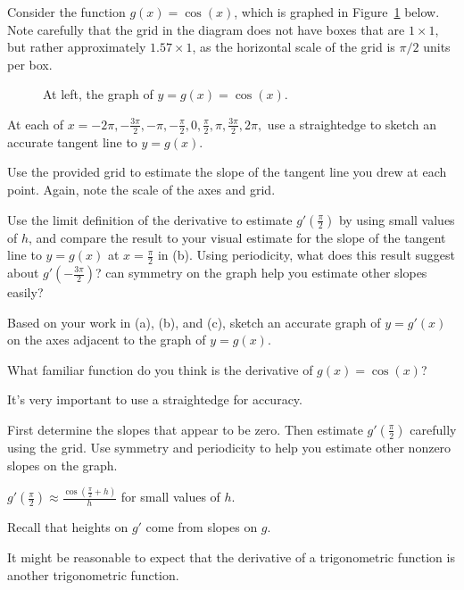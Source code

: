 \begin{activity} \label{A:2.2.2}  Consider the function $g(x) = \cos(x)$, which is graphed in Figure~\ref{F:2.2.A2} below.  Note carefully that the grid in the diagram does not have boxes that are $1 \times 1$, but rather approximately $1.57 \times 1$, as the horizontal scale of the grid is $\pi/2$ units per box.
\begin{figure}[h]
\begin{center}
\caption{At left, the graph of $y = g(x) = \cos(x)$.} \label{F:2.2.A2}
\end{center}
\end{figure}

\ba
	\item At each of $x = -2\pi, -\frac{3\pi}{2}, -\pi, -\frac{\pi}{2}, 0, \frac{\pi}{2}, \pi, \frac{3\pi}{2}, 2\pi,$ use a straightedge to sketch an accurate tangent line to $y = g(x)$.
	\item Use the provided grid to estimate the slope of the tangent line you drew at each point.  Again, note the scale of the axes and grid.
	\item Use the limit definition of the derivative to estimate $g'(\frac{\pi}{2})$ by using small values of $h$, and compare the result to your visual estimate for the slope of the tangent line to $y = g(x)$ at $x = \frac{\pi}{2}$ in (b).  Using periodicity, what does this result suggest about $g'(-\frac{3\pi}{2})$?  can symmetry on the graph help you estimate other slopes easily?  
	\item Based on your work in (a), (b), and (c), sketch an accurate graph of $y = g'(x)$ on the axes adjacent to the graph of $y = g(x)$.
	\item What familiar function do you think is the derivative of $g(x) = \cos(x)$?
\ea


\end{activity}
\begin{smallhint}
\ba
	\item It's very important to use a straightedge for accuracy.
	\item First determine the slopes that appear to be zero.  Then estimate $g'(\frac{\pi}{2})$ carefully using the grid.  Use symmetry and periodicity to help you estimate other nonzero slopes on the graph.
	\item $g'(\frac{\pi}{2}) \approx \frac{\cos(\frac{\pi}{2}+h)}{h}$ for small values of $h$. 
	\item Recall that heights on $g'$ come from slopes on $g$.
	\item It might be reasonable to expect that the derivative of a trigonometric function is another trigonometric function.
\ea
\end{smallhint}
